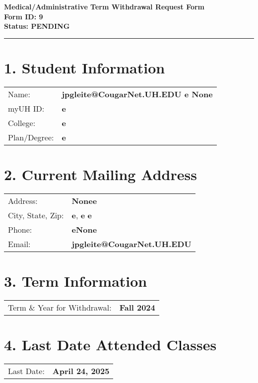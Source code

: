\documentclass[12pt]{article}
\begin{document}
\begin{center}
  \textbf{\Large Medical/Administrative Term Withdrawal Request Form}\\[0.2cm]
  \textbf{Form ID: 9}\\[0.2cm]
  \textbf{Status: PENDING}
\end{center}

\hrule
\vspace{0.5cm}

\section*{1. Student Information}
\begin{tabular}{ll}
Name: & \textbf{jpgleite@CougarNet.UH.EDU e None} \\
myUH ID: & \textbf{e} \\
College: & \textbf{e} \\
Plan/Degree: & \textbf{e} \\
\end{tabular}

\vspace{0.5cm}

\section*{2. Current Mailing Address}
\begin{tabular}{ll}
Address: & \textbf{Nonee} \\
City, State, Zip: & \textbf{e}, \textbf{e} \textbf{e} \\
Phone: & \textbf{eNone} \\
Email: & \textbf{jpgleite@CougarNet.UH.EDU} \\
\end{tabular}

\vspace{0.5cm}

\section*{3. Term Information}
\begin{tabular}{ll}
Term \& Year for Withdrawal: & \textbf{Fall 2024} \\
\end{tabular}

\vspace{0.5cm}

\section*{4. Last Date Attended Classes}
\begin{tabular}{ll}
Last Date: & \textbf{April 24, 2025} \\
\end{tabular}
\end{document}
